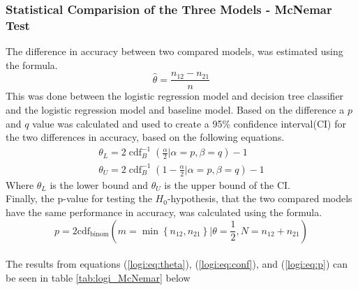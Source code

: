 \subsubsection{Statistical Comparision of the Three Models - McNemar Test}
The difference in accuracy between two compared models, was estimated using the formula.
	\begin{equation}
	\hat{\theta} = \frac{n_{12}-n_{21}}{n}
	\label{logi:eq:theta}
	\end{equation}
This was done between the logistic regression model and decision tree classifier and the logistic regression model and baseline model.
Based on the difference a $p$ and $q$ value was calculated and used to create a 95\% confidence interval(CI) for the two differences in accuracy, based on the following equations.
\begin{equation}
\begin{array}{l}{\theta_{L}=2 \operatorname{cdf}_{B}^{-1}\left(\frac{\alpha}{2} | \alpha=p, \beta=q\right)-1} \\ {\theta_{U}=2 \operatorname{cdf}_{B}^{-1}\left(1-\frac{\alpha}{2} | \alpha=p, \beta=q\right)-1}\end{array}
\label{logi:eq:conf}
\end{equation}
Where $\theta_{L}$ is the lower bound and $\theta_{U}$ is the upper bound of the CI.
\\
Finally, the p-value for testing the $H_{0}$-hypothesis, that the two compared models have the same performance in accuracy, was calculated using the formula.
\begin{equation}
p=2 \mathrm{cdf}_{\mathrm{binom}}\left(m=\min \left\{n_{12}, n_{21}\right\} | \theta=\frac{1}{2}, N=n_{12}+n_{21}\right)
\label{logi:eq:p}
\end{equation}
\\
The results from equations (\ref{logi:eq:theta}), (\ref{logi:eq:conf}), and (\ref{logi:eq:p}) can be seen in table \ref{tab:logi_McNemar} below

